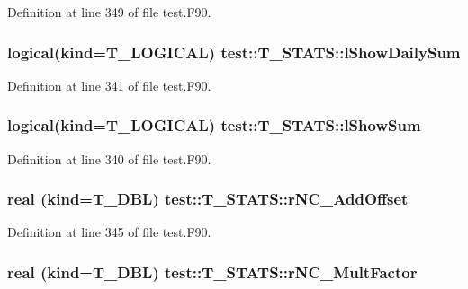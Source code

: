 Definition at line 349 of file test.F90.

\hypertarget{typetest_1_1_t___s_t_a_t_s_adc30a11ba2bac07f0e5cee6a7e5e74a1}{
\subsubsection[{lShowDailySum}]{\setlength{\rightskip}{0pt plus 5cm}logical(kind={\bf T\_\-LOGICAL}) {\bf test::T\_\-STATS::lShowDailySum}}}
\label{typetest_1_1_t___s_t_a_t_s_adc30a11ba2bac07f0e5cee6a7e5e74a1}


Definition at line 341 of file test.F90.

\hypertarget{typetest_1_1_t___s_t_a_t_s_a55ac267d57214ce01f87d4bfc5e2b3a5}{
\subsubsection[{lShowSum}]{\setlength{\rightskip}{0pt plus 5cm}logical(kind={\bf T\_\-LOGICAL}) {\bf test::T\_\-STATS::lShowSum}}}
\label{typetest_1_1_t___s_t_a_t_s_a55ac267d57214ce01f87d4bfc5e2b3a5}


Definition at line 340 of file test.F90.

\hypertarget{typetest_1_1_t___s_t_a_t_s_a0e98a9af6cb5ac17a252f4e86d150cf5}{
\subsubsection[{rNC\_\-AddOffset}]{\setlength{\rightskip}{0pt plus 5cm}real (kind={\bf T\_\-DBL}) {\bf test::T\_\-STATS::rNC\_\-AddOffset}}}
\label{typetest_1_1_t___s_t_a_t_s_a0e98a9af6cb5ac17a252f4e86d150cf5}


Definition at line 345 of file test.F90.

\hypertarget{typetest_1_1_t___s_t_a_t_s_a6e6cd81fc30076dc8c5d802dee77902b}{
\subsubsection[{rNC\_\-MultFactor}]{\setlength{\rightskip}{0pt plus 5cm}real (kind={\bf T\_\-DBL}) {\bf test::T\_\-STATS::rNC\_\-MultFactor}}}
\label{typetest_1_1_t___s_t_a_t_s_a6e6cd81fc30076dc8c5d802dee77902b}


